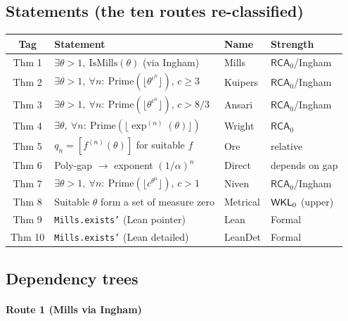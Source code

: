 \documentclass[11pt,reqno]{amsart}
\theoremstyle{redplain}
\numberwithin{equation}{section}
\begin{document}
\subsection{Statements (the ten routes re-classified)}

\label{sec:statements-tab}

\begin{center}
{\small 
\begin{tabular}{|c|m{5.4cm}|m{2.4cm}|m{1.8cm}|}
\hline
\textbf{Tag} & \textbf{Statement} & \textbf{Name} & \textbf{Strength} \\ 
\hline
Thm 1 & $\exists\theta>1,\ \mathrm{IsMills}(\theta)$ (via Ingham) & Mills & $%
\mathsf{RCA}_0$/Ingham \\ \hline
Thm 2 & $\exists\theta>1,\ \forall n:\ \mathrm{Prime}(\lfloor\theta^{c^n}%
\rfloor)$, $c\ge3$ & Kuipers & $\mathsf{RCA}_0$/Ingham \\ \hline
Thm 3 & $\exists\theta>1,\ \forall n:\ \mathrm{Prime}(\lfloor\theta^{c^n}%
\rfloor)$, $c>8/3$ & Ansari & $\mathsf{RCA}_0$/Ingham \\ \hline
Thm 4 & $\exists\theta,\ \forall n:\ \mathrm{Prime}(\lfloor\exp^{(n)}(%
\theta)\rfloor)$ & Wright & $\mathsf{RCA}_0$ \\ \hline
Thm 5 & $q_n=[f^{(n)}(\theta)]$ for suitable $f$ & Ore & relative \\ \hline
Thm 6 & Poly-gap $\to$ exponent $(1/\alpha)^n$ & Direct & depends on gap \\ 
\hline
Thm 7 & $\exists\theta>1,\ \forall n:\ \mathrm{Prime}(\lfloor
c^{\theta^n}\rfloor)$, $c>1$ & Niven & $\mathsf{RCA}_0$/Ingham \\ \hline
Thm 8 & Suitable $\theta$ form a set of measure zero & Metrical & $\mathsf{%
WKL}_0$ (upper) \\ \hline
Thm 9 & \texttt{Mills.exists'} (Lean pointer) & Lean & Formal \\ \hline
Thm 10 & \texttt{Mills.exists'} (Lean detailed) & LeanDet & Formal \\ \hline
\end{tabular}
}
\end{center}

\subsection{Dependency trees}

\label{sec:trees}

\paragraph{Route 1 (Mills via Ingham)}
\end{document}
